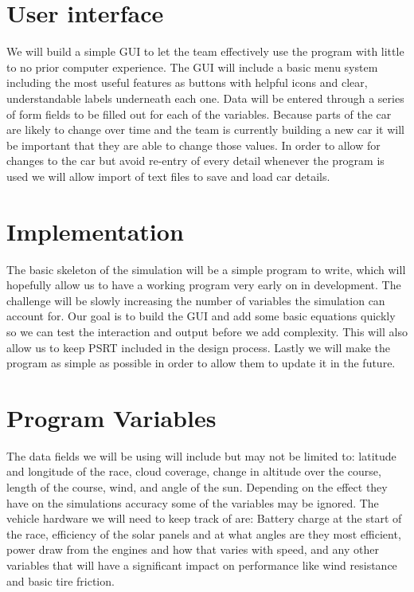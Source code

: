 \documentclass[onecolumn, draftclsnofoot,10pt, compsoc]{IEEEtran}
\begin{document}
\section{User interface}
We will build a simple GUI to let the team effectively use the program with little to no prior computer experience. 
The GUI will include a basic menu system including the most useful features as buttons with helpful icons and clear, understandable labels underneath each one. 
Data will be entered through a series of form fields to be filled out for each of the variables. 
Because parts of the car are likely to change over time and the team is currently building a new car it will be important that they are able to change those values. 
In order to allow for changes to the car but avoid re-entry of every detail whenever the program is used we will allow import of text files to save and load car details.

\section{Implementation}
The basic skeleton of the simulation will be a simple program to write, which will hopefully allow us to have a working program very early on in development. 
The challenge will be slowly increasing the number of variables the simulation can account for. 
Our goal is to build the GUI and add some basic equations quickly so we can test the interaction and output before we add complexity. 
This will also allow us to keep PSRT included in the design process. Lastly we will make the program as simple as possible in order to allow them to update it in the future.

\section{Program Variables}
The data fields we will be using will include but may not be limited to: latitude and longitude of the race, cloud coverage, change in altitude over the course, length of the course, wind, and angle of the sun. 
Depending on the effect they have on the simulations accuracy some of the variables may be ignored. 
The vehicle hardware we will need to keep track of are: Battery charge at the start of the race, efficiency of the solar panels and at what angles are they most efficient, power draw from the engines and how that varies with speed, and any other variables that will have a significant impact on performance like wind resistance and basic tire friction.
\end{document}
